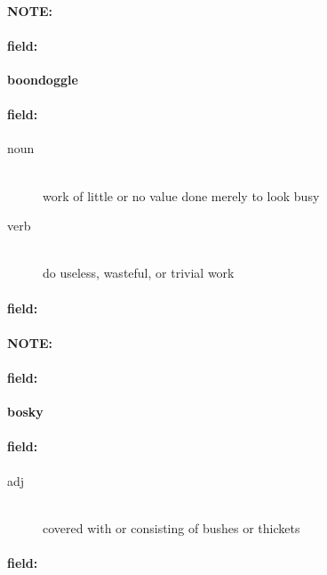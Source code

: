 \documentclass[12pt]{article}
\newenvironment{note}{\paragraph{NOTE:}}{}
\newenvironment{field}{\paragraph{field:}}{}
\begin{document}
\begin{note}
\begin{field}
\textbf{\large boondoggle}
\end{field}


\begin{field}
\begin{description}
\item[noun] \hfill \\ 
work of little or no value done merely to look busy

\item[verb] \hfill \\ 
do useless, wasteful, or trivial work

\end{description}
\end{field}

\begin{field}
\end{field}
\end{note}
\begin{note}
\begin{field}
\textbf{\large bosky}
\end{field}


\begin{field}
\begin{description}
\item[adj] \hfill \\ 
covered with or consisting of bushes or thickets

\end{description}
\end{field}

\begin{field}
\end{field}
\end{note}
\end{document}
